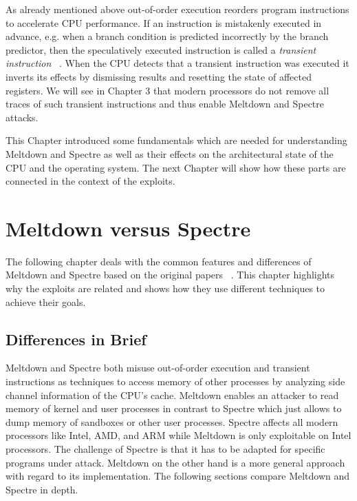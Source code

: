 \documentclass[a4paper,oneside,openright] {scrreprt}
\begin{document}
As already mentioned above out-of-order execution reorders program instructions to accelerate CPU performance.
If an instruction is mistakenly executed in advance, e.g. when a branch condition is predicted incorrectly by the branch predictor, 
then the speculatively executed instruction is called a \textit{transient instruction} ~\cite{lipp2018meltdown, kocher2018spectre}.
When the CPU detects that a transient instruction was executed it inverts its effects by dismissing results and resetting the state of affected registers.
We will see in Chapter 3 that modern processors do not remove all traces of such transient instructions and thus enable
Meltdown and Spectre attacks.

This Chapter introduced some fundamentals which are needed for understanding Meltdown and Spectre as well as their 
effects on the architectural state of the CPU and the operating system. The next Chapter will show how these parts
are connected in the context of the exploits.

\chapter{Meltdown versus Spectre}
\label{ch:contentI}

The following chapter deals with the common features and differences of Meltdown and Spectre based on the
 original papers ~\cite{lipp2018meltdown, kocher2018spectre}. This chapter highlights why the exploits are related
 and shows how they use different techniques to achieve their goals.
 
 
 \section{Differences in Brief}
 \label{ch:intro:motivation}
 
 Meltdown and Spectre both misuse out-of-order execution and transient instructions as techniques to access memory of 
 other processes by analyzing side channel information of the CPU's cache. 
  Meltdown enables an attacker to read memory of kernel and user processes
  in contrast to Spectre which just allows to dump memory of sandboxes or other user processes. Spectre affects all modern processors like Intel, AMD, and ARM while Meltdown
 is only exploitable on Intel processors. The challenge of Spectre is that it has to be adapted for specific programs under attack. 
 Meltdown on the other hand is a more general approach with regard to its implementation. The following sections compare Meltdown and Spectre in depth.
 
\end{document}
